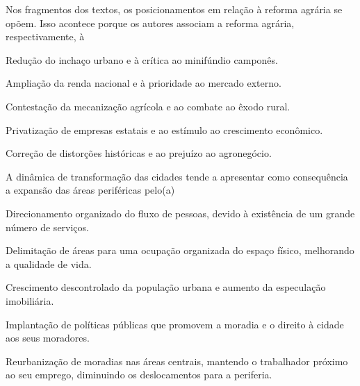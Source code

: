 \questao
{}
Nos fragmentos dos textos, os posicionamentos em relação à reforma agrária se opõem. Isso acontece porque os autores associam a reforma agrária, respectivamente, à
\begin{alternativas}
\item Redução do inchaço urbano e à crítica ao minifúndio camponês.
\item Ampliação da renda nacional e à prioridade ao mercado externo.
\item Contestação da mecanização agrícola e ao combate ao êxodo rural.
\item Privatização de empresas estatais e ao estímulo ao crescimento econômico.
\item Correção de distorções históricas e ao prejuízo ao agronegócio.
\end{alternativas}

\questao
A dinâmica de transformação das cidades tende a apresentar como consequência a expansão das áreas periféricas pelo(a)
\begin{alternativas}
\item Direcionamento organizado do fluxo de pessoas, devido à existência de um grande número de serviços.
\item Delimitação de áreas para uma ocupação organizada do espaço físico, melhorando a qualidade de vida.
\item Crescimento descontrolado da população urbana e aumento da especulação imobiliária.
\item Implantação de políticas públicas que promovem a moradia e o direito à cidade aos seus moradores.
\item Reurbanização de moradias nas áreas centrais, mantendo o trabalhador próximo ao seu emprego, diminuindo os deslocamentos para a periferia.
\end{alternativas}

